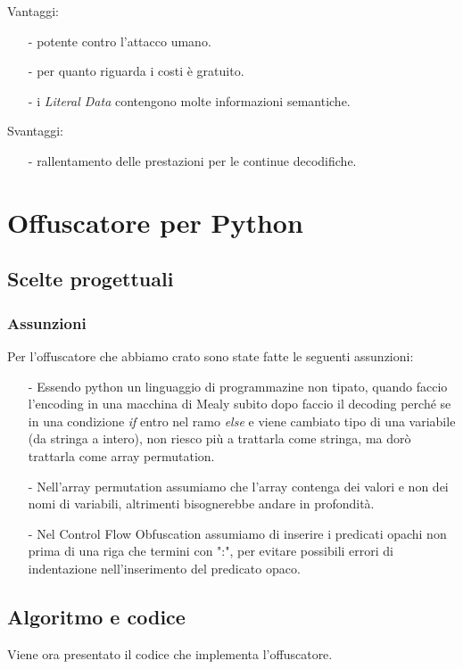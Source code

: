 \documentclass[a4paper,oneside,openright,titlepage,10pt,footinclude,headinclude]{scrbook}
\begin{document}
Vantaggi: 
\begin{itemize}
\item[-] potente contro l'attacco umano.
\item[-] per quanto riguarda i costi è gratuito.
\item[-] i \textit{Literal Data} contengono molte informazioni semantiche.
\end{itemize}

Svantaggi:
\begin{itemize}
\item[-] rallentamento delle prestazioni per le continue decodifiche.
\end{itemize}
 

\chapter{Offuscatore per Python}\label{offuscatore}

\section{Scelte progettuali}\label{offuscatore_scelte}


\subsection{Assunzioni}
Per l'offuscatore che abbiamo crato sono state fatte le seguenti assunzioni:
\begin{itemize}
\item[-] Essendo python un linguaggio di programmazine non tipato, quando faccio l'encoding in una macchina di Mealy subito dopo faccio il decoding perché se in una condizione \textit{if} entro nel ramo \textit{else} e viene cambiato tipo di una variabile (da stringa a intero), non riesco più a trattarla come stringa, ma dorò trattarla come array permutation.
\item[-] Nell'array permutation assumiamo che l'array contenga dei valori e non dei nomi di variabili, altrimenti bisognerebbe andare in profondità.
\item[-] Nel Control Flow Obfuscation assumiamo di inserire i predicati opachi non prima di una riga che termini con ":", per evitare possibili errori di indentazione nell'inserimento del predicato opaco.
\end{itemize}   

\section{Algoritmo e codice}\label{offuscatore_algo}
Viene ora presentato il codice che implementa l'offuscatore.\medskip
\end{document}
